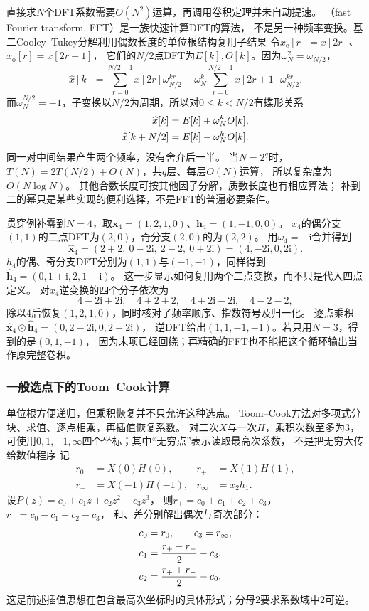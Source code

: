 直接求$N$个DFT系数需要$O(N^2)$运算，再调用卷积定理并未自动提速。
（fast Fourier transform, FFT）是一族快速计算DFT的算法，
不是另一种频率变换。基二Cooley--Tukey分解利用偶数长度的单位根结构复用子结果
令$x_{\mathrm e}[r]=x[2r]$、$x_{\mathrm o}[r]=x[2r+1]$，
它们的$N/2$点DFT为$E[k],O[k]$。因为$\omega_N^2=\omega_{N/2}$，
\[
  \widehat x[k]
  =\sum_{r=0}^{N/2-1}x[2r]\omega_{N/2}^{kr}
   +\omega_N^k\sum_{r=0}^{N/2-1}x[2r+1]\omega_{N/2}^{kr}.
\]
而$\omega_N^{N/2}=-1$，子变换以$N/2$为周期，所以对$0\leq k<N/2$有蝶形关系
\begin{align}
  \widehat x[k]&=E[k]+\omega_N^kO[k],\notag\\
  \widehat x[k+N/2]&=E[k]-\omega_N^kO[k].
  \label{eq:signal-analysis-fft-butterfly}
\end{align}
同一对中间结果产生两个频率，没有舍弃后一半。
当$N=2^q$时，$T(N)=2T(N/2)+O(N)$，共$q$层、每层$O(N)$运算，
所以复杂度为$O(N\log N)$。
其他合数长度可按其他因子分解，质数长度也有相应算法；
补到二的幂只是某些实现的便利选择，不是FFT的普遍必要条件。

贯穿例补零到$N=4$，取$\bm x_4=(1,2,1,0)$、$\bm h_4=(1,-1,0,0)$。
$x_4$的偶分支$(1,1)$的二点DFT为$(2,0)$，奇分支$(2,0)$的为$(2,2)$。
用$\omega_4=-\mathrm i$合并得到
\[
  \widehat{\bm x}_4=(2+2,\ 0-2\mathrm i,\ 2-2,\ 0+2\mathrm i)
  =(4,-2\mathrm i,0,2\mathrm i).
\]
$h_4$的偶、奇分支DFT分别为$(1,1)$与$(-1,-1)$，同样得到
$\widehat{\bm h}_4=(0,1+\mathrm i,2,1-\mathrm i)$。
这一步显示如何复用两个二点变换，而不只是代入四点定义。
对$x_4$逆变换的四个分子依次为
\[
  4-2\mathrm i+2\mathrm i,\quad 4+2+2,\quad
  4+2\mathrm i-2\mathrm i,\quad 4-2-2,
\]
除以$4$后恢复$(1,2,1,0)$，同时核对了频率顺序、指数符号及归一化。
逐点乘积
$\widehat{\bm x}_4\odot\widehat{\bm h}_4=(0,2-2\mathrm i,0,2+2\mathrm i)$，
逆DFT给出$(1,1,-1,-1)$。若只用$N=3$，得到的是$(0,1,-1)$，
因为末项已经回绕；再精确的FFT也不能把这个循环输出当作原完整卷积。

\subsubsection{一般选点下的Toom–Cook计算}

单位根方便递归，但乘积恢复并不只允许这种选点。
Toom--Cook方法对多项式分块、求值、逐点相乘，再插值恢复系数。
对二次$X$与一次$H$，乘积次数至多为$3$，
可使用$0,1,-1,\infty$四个坐标；其中“无穷点”表示读取最高次系数，
不是把无穷大传给数值程序
记
\begin{align*}
  r_0&=X(0)H(0),&r_+&=X(1)H(1),\\
  r_-&=X(-1)H(-1),&r_\infty&=x_2h_1.
\end{align*}
设$P(z)=c_0+c_1z+c_2z^2+c_3z^3$，
则$r_+=c_0+c_1+c_2+c_3$，$r_-=c_0-c_1+c_2-c_3$，
和、差分别解出偶次与奇次部分：
\begin{align}
  c_0&=r_0,\qquad c_3=r_\infty,\notag\\
  c_1&=\frac{r_+-r_-}{2}-c_3,\notag\\
  c_2&=\frac{r_++r_-}{2}-c_0.
  \label{eq:signal-analysis-toom-reconstruction}
\end{align}
这是前述插值思想在包含最高次坐标时的具体形式；分母$2$要求系数域中$2$可逆。

